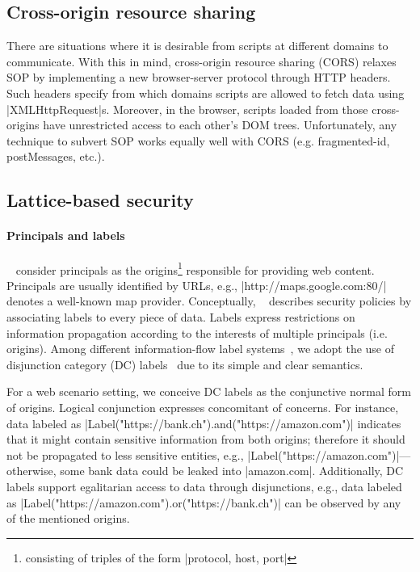 \subsection{Cross-origin resource sharing } 


There are situations where it is desirable from scripts at different domains to
communicate. With this in mind, cross-origin resource sharing (CORS) relaxes SOP
by implementing a new browser-server protocol through HTTP headers.  Such
headers specify from which domains scripts are allowed to fetch data 
using \js|XMLHttpRequest|s. Moreover, in the browser, scripts loaded from
those cross-origins have unrestricted access to each other's DOM
trees. Unfortunately, any technique to subvert SOP works equally well with CORS 
(e.g. fragmented-id, postMessages, etc.).


\subsection{Lattice-based security}

\paragraph{Principals and labels}

\sys~ consider principals as the origins\footnote{consisting of triples of the
  form \js|{protocol, host, port}|} responsible for providing web
content. Principals are usually identified by URLs, e.g., 
\js|http://maps.google.com:80/| denotes a well-known map provider.
Conceptually, \sys~ describes security policies by associating labels to every
piece of data. Labels express restrictions on information propagation according
to the interests of multiple principals (i.e. origins). Among different
information-flow label systems~\cite{GenLabels}, we adopt the use of disjunction
category (DC) labels~\cite{stefan:2011:dclabels} due to its simple and clear
semantics.

For a web scenario setting, we conceive DC labels as the conjunctive normal form
of origins. Logical conjunction expresses concomitant of concerns. For instance,
data labeled as \js|Label("https://bank.ch").and("https://amazon.com")|
indicates that it might contain sensitive information from both origins;
therefore it should not be propagated to less sensitive entities, e.g.,
\js|Label("https://amazon.com")|---otherwise, some bank data could be leaked
into \js|amazon.com|. Additionally, DC labels support egalitarian access to data
through disjunctions, e.g., data labeled as 
\js|Label("https://amazon.com").or("https://bank.ch")| can be
observed by any of the mentioned origins. 

